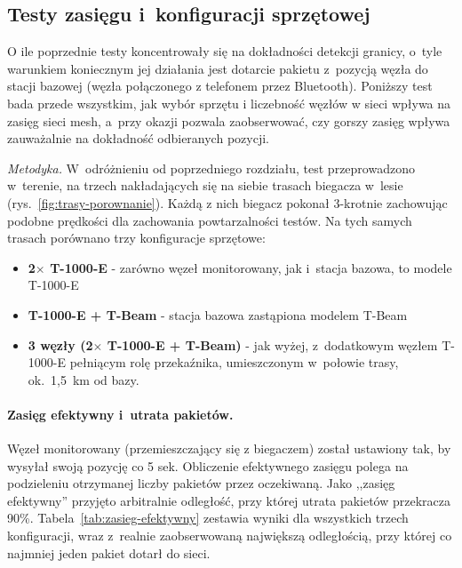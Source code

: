 \subsection*{Testy zasięgu i~konfiguracji sprzętowej}
\label{sec:zasieg-siec}

O ile poprzednie testy koncentrowały się na dokładności detekcji granicy, o~tyle warunkiem
koniecznym jej działania jest dotarcie pakietu z~pozycją węzła do stacji bazowej (węzła połączonego z telefonem przez Bluetooth). Poniższy test bada przede wszystkim, jak wybór sprzętu i liczebność węzłów w sieci wpływa na zasięg sieci mesh, a~przy okazji pozwala zaobserwować, czy gorszy zasięg wpływa zauważalnie na dokładność odbieranych pozycji.

\textit{Metodyka.} W~odróżnieniu od poprzedniego rozdziału, test przeprowadzono w~terenie, na trzech nakładających się na siebie trasach biegacza w~lesie (rys.~\ref{fig:trasy-porownanie}). Każdą z nich biegacz pokonał 3-krotnie zachowując podobne prędkości dla zachowania powtarzalności testów. Na tych samych trasach porównano trzy konfiguracje sprzętowe:

\begin{itemize}
    \item \textbf{2$\times$ T-1000-E} - zarówno węzeł monitorowany, jak i~stacja bazowa, to modele T-1000-E
    \item \textbf{T-1000-E + T-Beam} - stacja bazowa zastąpiona modelem T-Beam
    \item \textbf{3 węzły (2$\times$ T-1000-E + T-Beam)} - jak wyżej, z~dodatkowym węzłem T-1000-E
          pełniącym rolę przekaźnika, umieszczonym w~połowie trasy, ok.\ 1,5~km od bazy.
\end{itemize}

\paragraph{Zasięg efektywny i~utrata pakietów.}

Węzeł monitorowany (przemieszczający się z biegaczem) został ustawiony tak, by wysyłał swoją pozycję co 5 sek. Obliczenie efektywnego zasięgu polega na podzieleniu otrzymanej liczby pakietów przez oczekiwaną.
Jako ,,zasięg efektywny'' przyjęto arbitralnie odległość, przy której utrata pakietów przekracza 90\%. Tabela~\ref{tab:zasieg-efektywny} zestawia wyniki dla wszystkich trzech konfiguracji, wraz z~realnie zaobserwowaną największą odległością, przy której co najmniej jeden pakiet dotarł do sieci.

